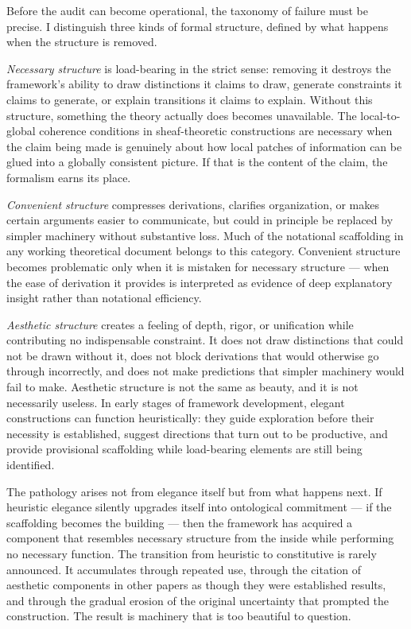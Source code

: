 \documentclass[12pt, a4paper]{article}
\begin{document}
Before the audit can become operational, the taxonomy of failure must be precise. I distinguish three kinds of formal structure, defined by what happens when the structure is removed.

\textit{Necessary structure} is load-bearing in the strict sense: removing it destroys the framework's ability to draw distinctions it claims to draw, generate constraints it claims to generate, or explain transitions it claims to explain. Without this structure, something the theory actually does becomes unavailable. The local-to-global coherence conditions in sheaf-theoretic constructions are necessary when the claim being made is genuinely about how local patches of information can be glued into a globally consistent picture. If that is the content of the claim, the formalism earns its place.

\textit{Convenient structure} compresses derivations, clarifies organization, or makes certain arguments easier to communicate, but could in principle be replaced by simpler machinery without substantive loss. Much of the notational scaffolding in any working theoretical document belongs to this category. Convenient structure becomes problematic only when it is mistaken for necessary structure --- when the ease of derivation it provides is interpreted as evidence of deep explanatory insight rather than notational efficiency.

\textit{Aesthetic structure} creates a feeling of depth, rigor, or unification while contributing no indispensable constraint. It does not draw distinctions that could not be drawn without it, does not block derivations that would otherwise go through incorrectly, and does not make predictions that simpler machinery would fail to make. Aesthetic structure is not the same as beauty, and it is not necessarily useless. In early stages of framework development, elegant constructions can function heuristically: they guide exploration before their necessity is established, suggest directions that turn out to be productive, and provide provisional scaffolding while load-bearing elements are still being identified.

The pathology arises not from elegance itself but from what happens next. If heuristic elegance silently upgrades itself into ontological commitment --- if the scaffolding becomes the building --- then the framework has acquired a component that resembles necessary structure from the inside while performing no necessary function. The transition from heuristic to constitutive is rarely announced. It accumulates through repeated use, through the citation of aesthetic components in other papers as though they were established results, and through the gradual erosion of the original uncertainty that prompted the construction. The result is machinery that is too beautiful to question.
\end{document}
